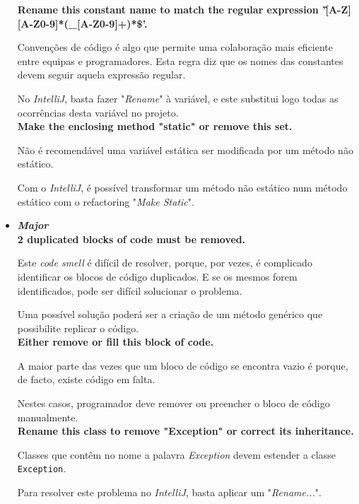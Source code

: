 \documentclass[a4paper]{report}
\begin{document}
\begin{itemize}
    \textbf{Rename this constant name to match the regular expression '\^[A-Z][A-Z0-9]*(\_[A-Z0-9]+)*\$'.}

    Convenções de código é algo que permite uma colaboração mais eficiente entre equipas e programadores. Esta regra diz que os nomes das constantes devem seguir aquela expressão regular.
    
    No \textit{IntelliJ}, basta fazer "\textit{Rename}" à variável, e este substitui logo todas as ocorrências desta variável no projeto.\\
    
    \textbf{Make the enclosing method "static" or remove this set.}
    
    Não é recomendável uma variável estática ser modificada por um método não estático.
    
    Com o \textit{IntelliJ}, é possível transformar um método não estático num método estático com o refactoring "\textit{Make Static}".\\
    
    \item \textit{\textbf{Major}}\\
    \textbf{2 duplicated blocks of code must be removed.} 
    
    Este \textit{code smell} é difícil de resolver, porque, por vezes, é complicado identificar os blocos de código duplicados.
    E se os mesmos forem identificados, pode ser difícil solucionar o problema.
    
    Uma possível solução poderá ser a criação de um método genérico que possibilite replicar o código. \\
    
    \textbf{Either remove or fill this block of code.}
    
    A maior parte das vezes que um bloco de código se encontra vazio é porque, de facto, existe código em falta.
    
    Nestes casos, programador deve remover ou preencher o bloco de código manualmente.\\
    
    
    \textbf{Rename this class to remove "Exception" or correct its inheritance.}
    
    Classes que contêm no nome a palavra \textit{Exception} devem estender a classe \texttt{Exception}.
    
    Para resolver este problema no \textit{IntelliJ}, basta aplicar um "\textit{Rename...}".\\
    

\end{itemize}
\end{document}
